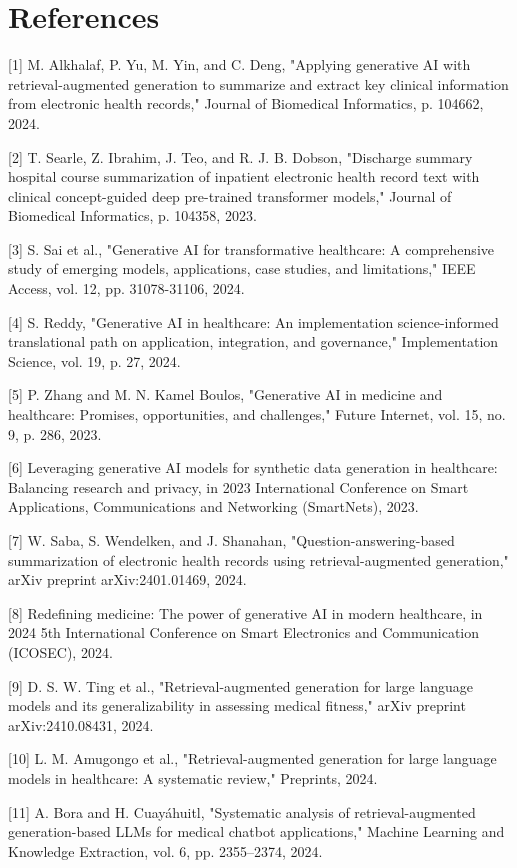 \section{References}

[1] M. Alkhalaf, P. Yu, M. Yin, and C. Deng, "Applying generative AI with retrieval-augmented generation to summarize and extract key clinical information from electronic health records," Journal of Biomedical Informatics, p. 104662, 2024.

[2] T. Searle, Z. Ibrahim, J. Teo, and R. J. B. Dobson, "Discharge summary hospital course summarization of inpatient electronic health record text with clinical concept-guided deep pre-trained transformer models," Journal of Biomedical Informatics, p. 104358, 2023.

[3] S. Sai et al., "Generative AI for transformative healthcare: A comprehensive study of emerging models, applications, case studies, and limitations," IEEE Access, vol. 12, pp. 31078-31106, 2024.

[4] S. Reddy, "Generative AI in healthcare: An implementation science-informed translational path on application, integration, and governance," Implementation Science, vol. 19, p. 27, 2024.

[5] P. Zhang and M. N. Kamel Boulos, "Generative AI in medicine and healthcare: Promises, opportunities, and challenges," Future Internet, vol. 15, no. 9, p. 286, 2023.

[6] Leveraging generative AI models for synthetic data generation in healthcare: Balancing research and privacy, in 2023 International Conference on Smart Applications, Communications and Networking (SmartNets), 2023.

[7] W. Saba, S. Wendelken, and J. Shanahan, "Question-answering-based summarization of electronic health records using retrieval-augmented generation," arXiv preprint arXiv:2401.01469, 2024.

[8] Redefining medicine: The power of generative AI in modern healthcare, in 2024 5th International Conference on Smart Electronics and Communication (ICOSEC), 2024.

[9] D. S. W. Ting et al., "Retrieval-augmented generation for large language models and its generalizability in assessing medical fitness," arXiv preprint arXiv:2410.08431, 2024.

[10] L. M. Amugongo et al., "Retrieval-augmented generation for large language models in healthcare: A systematic review," Preprints, 2024.

[11] A. Bora and H. Cuayáhuitl, "Systematic analysis of retrieval-augmented generation-based LLMs for medical chatbot applications," Machine Learning and Knowledge Extraction, vol. 6, pp. 2355–2374, 2024.

